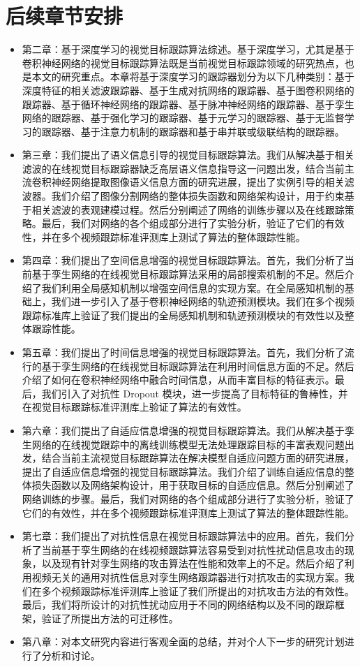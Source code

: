 \section{后续章节安排}
\begin{itemize}
\item 第二章：基于深度学习的视觉目标跟踪算法综述。基于深度学习，尤其是基于卷积神经网络的视觉目标跟踪算法既是当前视觉目标跟踪领域的研究热点，也是本文的研究重点。本章将基于深度学习的跟踪器划分为以下几种类别：基于深度特征的相关滤波跟踪器、基于生成对抗网络的跟踪器、基于图卷积网络的跟踪器、基于循环神经网络的跟踪器、基于脉冲神经网络的跟踪器、基于孪生网络的跟踪器、基于强化学习的跟踪器、基于元学习的跟踪器、基于无监督学习的跟踪器、基于注意力机制的跟踪器和基于串并联或级联结构的跟踪器。
\item 第三章：我们提出了语义信息引导的视觉目标跟踪算法。我们从解决基于相关滤波的在线视觉目标跟踪器缺乏高层语义信息指导这一问题出发，结合当前主流卷积神经网络提取图像语义信息方面的研究进展，提出了实例引导的相关滤波器。我们介绍了图像分割网络的整体损失函数和网络架构设计，用于约束基于相关滤波的表观建模过程。然后分别阐述了网络的训练步骤以及在线跟踪策略。最后，我们对网络的各个组成部分进行了实验分析，验证了它们的有效性，并在多个视频跟踪标准评测库上测试了算法的整体跟踪性能。%
\item 第四章：我们提出了空间信息增强的视觉目标跟踪算法。首先，我们分析了当前基于孪生网络的在线视觉目标跟踪算法采用的局部搜索机制的不足。然后介绍了我们利用全局感知机制以增强空间信息的实现方案。在全局感知机制的基础上，我们进一步引入了基于卷积神经网络的轨迹预测模块。我们在多个视频跟踪标准库上验证了我们提出的全局感知机制和轨迹预测模块的有效性以及整体跟踪性能。
\item 第五章：我们提出了时间信息增强的视觉目标跟踪算法。首先，我们分析了流行的基于孪生网络的在线视觉目标跟踪算法在利用时间信息方面的不足。然后介绍了如何在卷积神经网络中融合时间信息，从而丰富目标的特征表示。最后，我们引入了对抗性 Dropout 模块，进一步提高了目标特征的鲁棒性，并在视觉目标跟踪标准评测库上验证了算法的有效性。
\item 第六章：我们提出了自适应信息增强的视觉目标跟踪算法。我们从解决基于孪生网络的在线视觉跟踪中的离线训练模型无法处理跟踪目标的丰富表观问题出发，结合当前主流视觉目标跟踪算法在解决模型自适应问题方面的研究进展，提出了自适应信息增强的视觉目标跟踪算法。我们介绍了训练自适应信息的整体损失函数以及网络架构设计，用于获取目标的自适应信息。然后分别阐述了网络训练的步骤。最后，我们对网络的各个组成部分进行了实验分析，验证了它们的有效性，并在多个视频跟踪标准评测库上测试了算法的整体跟踪性能。
\item 第七章：我们提出了对抗性信息在视觉目标跟踪算法中的应用。首先，我们分析了当前基于孪生网络的在线视频跟踪算法容易受到对抗性扰动信息攻击的现象，以及现有针对孪生网络的攻击算法在性能和效率上的不足。然后介绍了利用视频无关的通用对抗性信息对孪生网络跟踪器进行对抗攻击的实现方案。我们在多个视频跟踪标准评测库上验证了我们所提出的对抗攻击方法的有效性。最后，我们将所设计的对抗性扰动应用于不同的网络结构以及不同的跟踪框架，验证了所提出方法的可迁移性。
\item 第八章：对本文研究内容进行客观全面的总结，并对个人下一步的研究计划进行了分析和讨论。
\end{itemize}